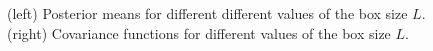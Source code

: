 \documentclass[]{interact}
\theoremstyle{plain}%
\theoremstyle{definition}
\theoremstyle{remark}
\begin{document}
\begin{figure}
\centering
{}
\caption{(left) Posterior means for different different values of the box size $L$. (right) Covariance functions for different values of the box size $L$.}
  \label{fig2_Post_L}
\end{figure}
\end{document}
